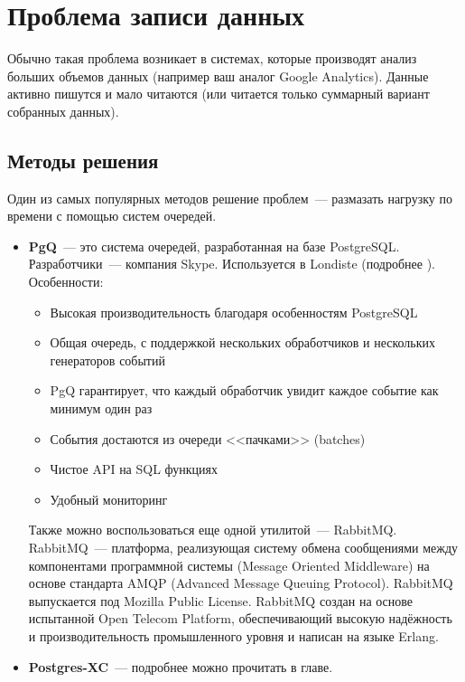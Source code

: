 \section{Проблема записи данных}

Обычно такая проблема возникает в системах, которые производят анализ больших объемов данных (например ваш аналог Google Analytics).
Данные активно пишутся и мало читаются (или читается только суммарный вариант собранных данных).

\subsection{Методы решения}

Один из самых популярных методов решение проблем~--- размазать нагрузку по времени с помощью систем очередей.
\begin{itemize}
\item \textbf{PgQ}~--- это система очередей, разработанная на базе PostgreSQL. Разработчики~--- компания Skype.
Используется в Londiste (подробнее ). Особенности:
\begin{itemize}
\item Высокая производительность благодаря особенностям PostgreSQL
\item Общая очередь, с поддержкой нескольких обработчиков и нескольких генераторов событий
\item PgQ гарантирует, что каждый обработчик увидит каждое событие как минимум один раз
\item События достаются из очереди <<пачками>> (batches)
\item Чистое API на SQL функциях
\item Удобный мониторинг
\end{itemize}

Также можно воспользоваться еще одной утилитой~--- RabbitMQ.
RabbitMQ~--- платформа, реализующая систему обмена сообщениями между компонентами программной системы (Message Oriented Middleware)
на основе стандарта AMQP (Advanced Message Queuing Protocol). RabbitMQ выпускается под Mozilla Public License.
RabbitMQ создан на основе испытанной Open Telecom Platform, обеспечивающий высокую надёжность и производительность промышленного
уровня и написан на языке Erlang.

\item \textbf{Postgres-XC}~--- подробнее можно прочитать в  главе.
\end{itemize}